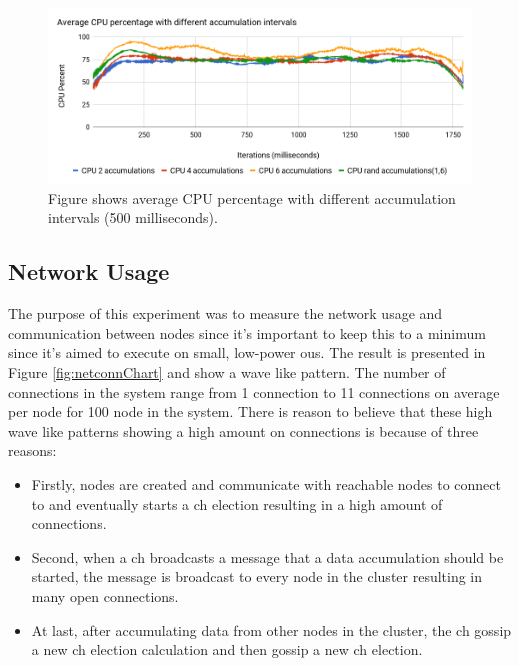\documentclass[USenglish]{uit-thesis}
\begin{document}


\begin{figure} [ht]
\centering
\includegraphics[width=\textwidth]{cpuChart.png}
\caption{Figure shows average CPU percentage with different accumulation intervals (500 milliseconds).}
\label{fig:cpuChart}
\end{figure}


\newpage

\subsection{Network Usage}
The purpose of this experiment was to measure the network usage and communication between nodes since it's important to keep this to a minimum since it's aimed to execute on small, low-power \gls{ou}s. The result is presented in Figure \ref{fig:netconnChart} and show a wave like pattern. The number of connections in the system range from 1 connection to 11 connections on average per node for 100 node in the system.
There is reason to believe that these high wave like patterns showing a high amount on connections is because of three reasons:

\begin{itemize}
\item Firstly, nodes are created and communicate with reachable nodes to connect to and eventually starts a \gls{ch} election resulting in a high amount of connections.
\item Second, when a \gls{ch} broadcasts a message that a data accumulation should be started, the message is broadcast to every node in the cluster resulting in many open connections.
\item At last, after accumulating data from other nodes in the cluster, the \gls{ch} gossip a new \gls{ch} election calculation and then gossip a new \gls{ch} election.
\end{itemize}
\end{document}
